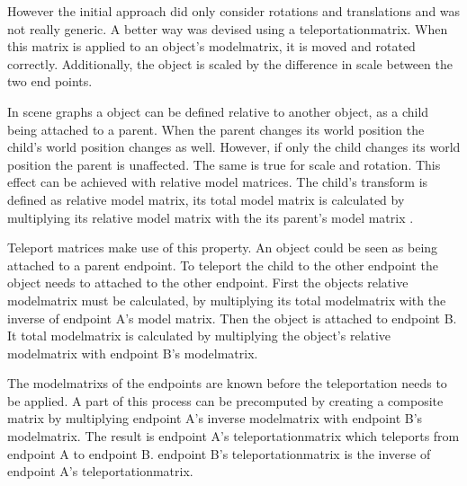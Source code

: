 However the initial approach did only consider rotations and translations and was not really generic. A better way was devised using a \gls{teleportationmatrix}. When this matrix is applied to an object's \gls{modelmatrix}, it is moved and rotated correctly. Additionally, the object is scaled by the difference in scale between the two end points.




In scene graphs a object can be defined relative to another object, as a child being attached to a parent. When the parent changes its world position the child's world position changes as well. However, if only the child changes its world position the parent is unaffected. The same is true for scale and rotation. This effect can be achieved with relative model matrices. The child's transform is defined as relative model matrix, its total model matrix is calculated by multiplying its relative model matrix with the its parent's model matrix \cite{akine:2018:realtime}.

Teleport matrices make use of this property. An object could be seen as being attached to a parent \gls{endpoint}. To teleport the child to the other endpoint the object needs to attached to the other endpoint. First the objects relative \gls{modelmatrix} must be calculated, by multiplying its total \gls{modelmatrix} with the inverse of \gls{endpoint} A's model matrix. Then the object is attached to \gls{endpoint} B. It total \gls{modelmatrix} is calculated by multiplying the object's relative \gls{modelmatrix} with \gls{endpoint} B's \gls{modelmatrix}.

The \glspl{modelmatrix} of the endpoints are known before the teleportation needs to be applied. A part of this process can be precomputed by creating a composite matrix by multiplying \gls{endpoint} A's inverse \gls{modelmatrix} with \gls{endpoint} B's \gls{modelmatrix}. The result is \gls{endpoint} A's \gls{teleportationmatrix} which teleports from \gls{endpoint} A to \gls{endpoint} B. \Gls{endpoint} B's \gls{teleportationmatrix} is the inverse of \gls{endpoint} A's \gls{teleportationmatrix}.



